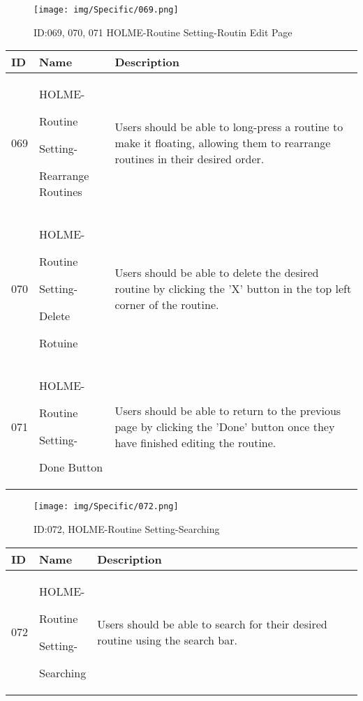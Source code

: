 \documentclass[conference]{IEEEtran}
\begin{document}
\begin{enumerate}
\begin{figure}[h]
\centering
\texttt{[image: img/Specific/069.png]}
\caption{ID:069, 070, 071 HOLME-Routine Setting-Routin Edit Page}
\end{figure}
\begin{table}[h]
\def\arraystretch{1.2} \small
    \begin{tabular}{|p{1cm}|p{1.8cm}|p{5.0cm}|}
        \hline
        ID & Name & Description\\ \hline
         069 \par  & HOLME-\par Routine \par Setting- \par Rearrange Routines & 
Users should be able to long-press a routine to make it floating, allowing them to rearrange routines in their desired order.\\ \hline
         070 \par  & HOLME-\par Routine \par Setting- \par Delete \par Rotuine & 
Users should be able to delete the desired routine by clicking the 'X' button in the top left corner of the routine.\\ \hline
	071 \par  & HOLME-\par Routine \par Setting- \par Done Button & 
Users should be able to return to the previous page by clicking the 'Done' button once they have finished editing the routine. \\ \hline     
    \end{tabular}
\end{table}
\clearpage

\begin{figure}[h]
\centering
\texttt{[image: img/Specific/072.png]}
\caption{ID:072, HOLME-Routine Setting-Searching}
\end{figure}
\begin{table}[h]
\def\arraystretch{1.2} \small
    \begin{tabular}{|p{1cm}|p{1.8cm}|p{5.0cm}|}
        \hline
        ID & Name & Description\\ \hline
         072 \par  & HOLME-\par Routine \par Setting- \par Searching  & 
Users should be able to search for their desired routine using the search bar. \\ \hline
    \end{tabular}
\end{table}


\end{enumerate}
\end{document}
